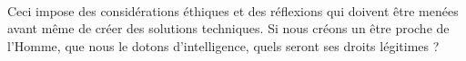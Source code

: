 \documentclass[a4paper,10pt]{article}
\begin{document}
        \paragraph{}
            Ceci impose des considérations éthiques et des réflexions qui 
            doivent être menées avant même de créer des solutions 
            techniques. Si nous créons un être proche de l'Homme, 
            que nous le dotons d'intelligence, quels seront ses droits légitimes ? 
    
\end{document}

